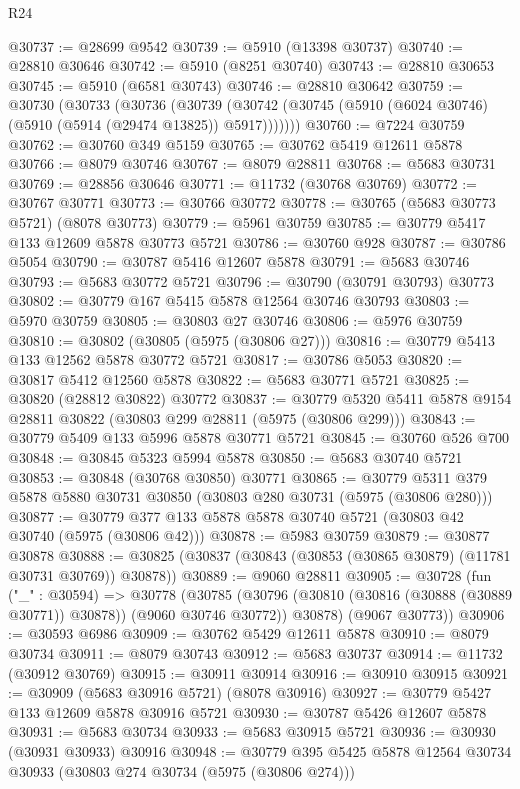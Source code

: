 \begin{lexlean}{R24}
\begin{coremodule}
@30737 := @28699 @9542
@30739 := @5910 (@13398 @30737)
@30740 := @28810 @30646
@30742 := @5910 (@8251 @30740)
@30743 := @28810 @30653
@30745 := @5910 (@6581 @30743)
@30746 := @28810 @30642
@30759 := @30730
    (@30733
      (@30736
        (@30739 (@30742 (@30745 (@5910 (@6024 @30746) (@5910 (@5914 (@29474 @13825)) @5917)))))))
@30760 := @7224 @30759
@30762 := @30760 @349 @5159
@30765 := @30762 @5419 @12611 @5878
@30766 := @8079 @30746
@30767 := @8079 @28811
@30768 := @5683 @30731
@30769 := @28856 @30646
@30771 := @11732 (@30768 @30769)
@30772 := @30767 @30771
@30773 := @30766 @30772
@30778 := @30765 (@5683 @30773 @5721) (@8078 @30773)
@30779 := @5961 @30759
@30785 := @30779 @5417 @133 @12609 @5878 @30773 @5721
@30786 := @30760 @928
@30787 := @30786 @5054
@30790 := @30787 @5416 @12607 @5878
@30791 := @5683 @30746
@30793 := @5683 @30772 @5721
@30796 := @30790 (@30791 @30793) @30773
@30802 := @30779 @167 @5415 @5878 @12564 @30746 @30793
@30803 := @5970 @30759
@30805 := @30803 @27 @30746
@30806 := @5976 @30759
@30810 := @30802 (@30805 (@5975 (@30806 @27)))
@30816 := @30779 @5413 @133 @12562 @5878 @30772 @5721
@30817 := @30786 @5053
@30820 := @30817 @5412 @12560 @5878
@30822 := @5683 @30771 @5721
@30825 := @30820 (@28812 @30822) @30772
@30837 := @30779 @5320 @5411 @5878 @9154 @28811 @30822 (@30803 @299 @28811 (@5975 (@30806 @299)))
@30843 := @30779 @5409 @133 @5996 @5878 @30771 @5721
@30845 := @30760 @526 @700
@30848 := @30845 @5323 @5994 @5878
@30850 := @5683 @30740 @5721
@30853 := @30848 (@30768 @30850) @30771
@30865 := @30779 @5311 @379 @5878 @5880 @30731 @30850 (@30803 @280 @30731 (@5975 (@30806 @280)))
@30877 := @30779 @377 @133 @5878 @5878 @30740 @5721 (@30803 @42 @30740 (@5975 (@30806 @42)))
@30878 := @5983 @30759
@30879 := @30877 @30878
@30888 := @30825 (@30837 (@30843 (@30853 (@30865 @30879) (@11781 @30731 @30769)) @30878))
@30889 := @9060 @28811
@30905 := @30728
    (fun ("_" : @30594) =>
    @30778
      (@30785
        (@30796 (@30810 (@30816 (@30888 (@30889 @30771)) @30878)) (@9060 @30746 @30772))
        @30878)
      (@9067 @30773))
@30906 := @30593 @6986
@30909 := @30762 @5429 @12611 @5878
@30910 := @8079 @30734
@30911 := @8079 @30743
@30912 := @5683 @30737
@30914 := @11732 (@30912 @30769)
@30915 := @30911 @30914
@30916 := @30910 @30915
@30921 := @30909 (@5683 @30916 @5721) (@8078 @30916)
@30927 := @30779 @5427 @133 @12609 @5878 @30916 @5721
@30930 := @30787 @5426 @12607 @5878
@30931 := @5683 @30734
@30933 := @5683 @30915 @5721
@30936 := @30930 (@30931 @30933) @30916
@30948 := @30779 @395 @5425 @5878 @12564 @30734 @30933 (@30803 @274 @30734 (@5975 (@30806 @274)))

\end{coremodule}
\end{lexlean}
